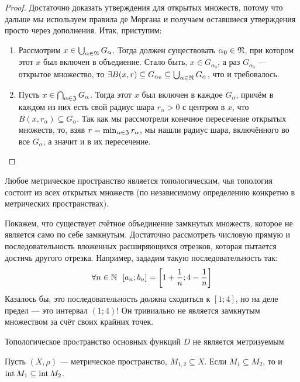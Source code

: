 \begin{proof}
	Достаточно доказать утверждения для открытых множеств, потому что дальше мы используем правила де Моргана и получаем оставшиеся утверждения просто через дополнения. Итак, приступим:
	\begin{enumerate}
		\item Рассмотрим $x \in \bigcup_{\alpha \in \mathfrak{N}} G_\alpha$. Тогда должен существовать $\alpha_0 \in \mathfrak{N}$, при котором этот $x$ был включен в объедиение. Стало быть, $x \in G_{\alpha_0}$, а раз $G_{\alpha_0}$ --- открытое множество, то $\exists B(x, r) \subseteq G_{\alpha_0} \subseteq \bigcup_{\alpha \in \mathfrak{N}} G_\alpha$, что и требовалось.
		
		\item Пусть $x \in \bigcap_{\alpha \in \mathfrak{Z}} G_\alpha$. Тогда этот $x$ был включен в каждое $G_\alpha$, причём в каждом из них есть свой радиус шара $r_\alpha > 0$ с центром в $x$, что $B(x, r_\alpha) \subseteq G_\alpha$. Так как мы рассмотрели конечное пересечение открытых множеств, то, взяв $r = \min_{\alpha \in \mathfrak{Z}} r_\alpha$, мы нашли радиус шара, включённого во все $G_\alpha$, а значит и в их пересечение.
	\end{enumerate}
\end{proof}

\begin{corollary}
	Любое метрическое пространство является топологическим, чья топология состоит из всех открытых множеств (по независимому определению конкретно в метрических пространствах).
\end{corollary}

\begin{example}
	Покажем, что существует счётное объединение замкнутых множеств, которое не является само по себе замкнутым. Достаточно рассмотреть числовую прямую и последовательность вложенных расширяющихся отрезков, которая пытается достичь другого отрезка. Например, зададим такую последовательность так:
	\[
		\forall n \in \N\ \ [a_n; b_n] = \sbr{1 + \frac{1}{n}; 4 - \frac{1}{n}}
	\]
	Казалось бы, это последовательность должна сходиться к $[1; 4]$, но на деле предел --- это интервал $(1; 4)$! Он тривиально не является замкнутым множеством за счёт своих крайних точек.
\end{example}

\begin{exercise}
	Топологическое проcтранство основных функций $D$ не является метризуемым
\end{exercise}

\begin{lemma}
	Пусть $(X, \rho)$ --- метрическое пространство, $M_{1, 2} \subseteq X$. Если $M_1 \subseteq M_2$, то и $\operatorname{int} M_1 \subseteq \operatorname{int} M_2$.
\end{lemma}

